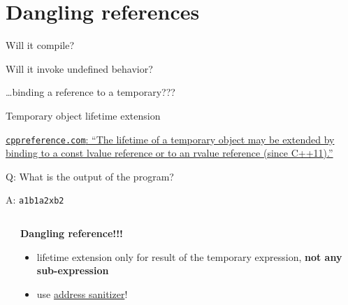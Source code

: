 \begin{frame}
    \centering
    \scalebox{3}{Dangling References}
\end{frame}

\section{Dangling references}

\begin{frame}[fragile]{Will it compile?}

\end{frame}

\begin{frame}[fragile]{Will it invoke undefined behavior?}

    \hfill \ldots binding a reference to a temporary???
\end{frame}

\begin{frame}[fragile]{Temporary object lifetime extension}

    \href{https://en.cppreference.com/w/cpp/language/lifetime}{\texttt{cppreference.com}: \enquote{The lifetime of a temporary object may be extended by binding to a const lvalue reference or to an rvalue reference (since C++11).}}
\end{frame}

\begin{frame}[fragile]{Q: What is the output of the program?}
\end{frame}

\begin{frame}[fragile]{A: \texttt{a1b1a2xb2}}
    \begin{columns}
        \begin{column}{.55\textwidth}
        \end{column}
        \begin{column}{.4\textwidth}
            \textbf{Dangling reference!!!}
            \begin{itemize}
                \item lifetime extension only for result of the temporary expression, \textbf{not any sub-expression}
                \item use \href{https://clang.llvm.org/docs/AddressSanitizer.html}{address sanitizer}!    
            \end{itemize}
        \end{column}
    \end{columns}
\end{frame}

